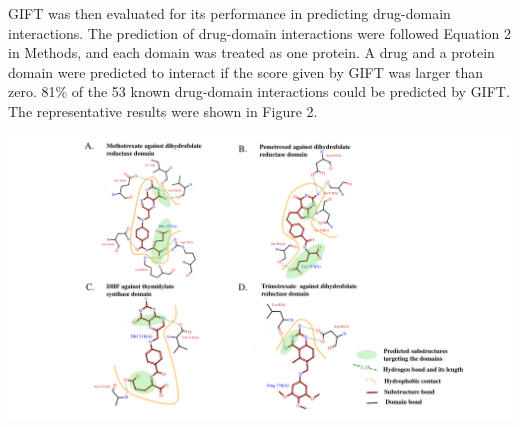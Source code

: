 \documentclass[a0,portrait]{a0poster}
\begin{document}
\begin{multicols}{2}
GIFT was then evaluated for its performance in predicting drug-domain interactions. The prediction of drug-domain interactions were followed Equation 2 in Methods, and each domain was treated as one protein. A drug and a protein domain were predicted to interact if the score given by GIFT was larger than zero.
81\% of the 53 known drug-domain interactions could be predicted by GIFT. The representative results were shown in Figure 2.

\begin{center}\vspace{1cm}
  \includegraphics[width=0.9\linewidth]{ligplot_5}
\end{center}\vspace{1cm}



\end{multicols}
\end{document}
